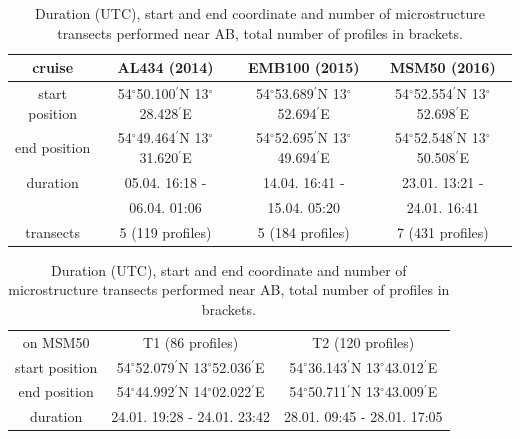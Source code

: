  \begin{table}
\caption{Duration (UTC), start and end coordinate and number of microstructure 
transects performed near AB, total number of profiles in 
brackets.}\label{mss}
\begin{center}
\begin{tabular}{cccc}
cruise & AL434 (2014) & EMB100 (2015) & MSM50 (2016)\\
\hline
start position & 54$^\circ$50.100$^\prime$N 13$^\circ$28.428$^\prime$E & 
54$^\circ$53.689$^\prime$N 13$^\circ$52.694$^\prime$E & 
54$^\circ$52.554$^\prime$N 13$^\circ$52.698$^\prime$E\\
end position & 54$^\circ$49.464$^\prime$N 13$^\circ$31.620$^\prime$E & 
54$^\circ$52.695$^\prime$N 13$^\circ$49.694$^\prime$E & 
54$^\circ$52.548$^\prime$N 13$^\circ$50.508$^\prime$E\\
\hline
duration & 05.04. 16:18 - & 14.04. 16:41 -  & 23.01. 
13:21 -  \\
&  06.04. 01:06 & 15.04. 05:20 & 24.01. 16:41 \\
\hline
transects & 5 (119 profiles) & 5 (184 profiles) & 7 (431 profiles)\\
\end{tabular}
\end{center}
\vskip 0.5cm
\begin{tabular}{ccc}
 on MSM50 & T1 (86 profiles) & T2 (120 profiles) \\
 start position & 54$^\circ$52.079$^\prime$N 13$^\circ$52.036$^\prime$E & 
54$^\circ$36.143$^\prime$N 13$^\circ$43.012$^\prime$E\\
 end position & 54$^\circ$44.992$^\prime$N 14$^\circ$02.022$^\prime$E & 
54$^\circ$50.711$^\prime$N 13$^\circ$43.009$^\prime$E\\
 duration & 24.01. 19:28 - 24.01. 23:42 & 28.01. 09:45 - 28.01. 17:05 \\
\end{tabular}


\end{table}

